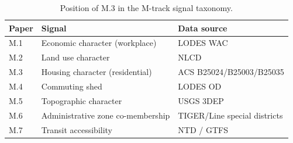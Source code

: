 \begin{table}[ht]
\centering
\caption{Position of M.3 in the M-track signal taxonomy.}
\label{tab:mtrack-position}
\small
\begin{tabular}{lll}
\toprule
Paper & Signal & Data source \\
\midrule
M.1 & Economic character (workplace) & LODES WAC \\
M.2 & Land use character & NLCD \\
M.3 & Housing character (residential) & ACS B25024/B25003/B25035 \\
M.4 & Commuting shed & LODES OD \\
M.5 & Topographic character & USGS 3DEP \\
M.6 & Administrative zone co-membership & TIGER/Line special districts \\
M.7 & Transit accessibility & NTD / GTFS \\
\bottomrule
\end{tabular}
\end{table}
